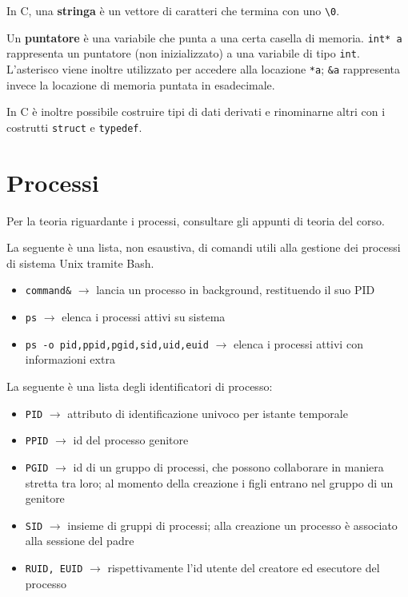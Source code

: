 \documentclass[11pt]{article}
\begin{document}
In C, una \textbf{stringa} è un vettore di caratteri che termina con uno \verb|\0|.

Un \textbf{puntatore} è una variabile che punta a una certa casella di memoria. \verb|int* a| rappresenta un puntatore (non inizializzato) a una variabile di tipo \verb|int|. L'asterisco viene inoltre utilizzato per accedere alla locazione \verb|*a|; \verb|&a| rappresenta invece la locazione di memoria puntata in esadecimale.

In C è inoltre possibile costruire tipi di dati derivati e rinominarne altri con i costrutti \verb|struct| e \verb|typedef|.

\section{Processi}

Per la teoria riguardante i processi, consultare gli appunti di teoria del corso.

La seguente è una lista, non esaustiva, di comandi utili alla gestione dei processi di sistema Unix tramite Bash.

\begin{itemize}
    \item \verb|command&| $\rightarrow$ lancia un processo in background, restituendo il suo PID
    \item \verb|ps| $\rightarrow$ elenca i processi attivi su sistema
    \item \verb|ps -o pid,ppid,pgid,sid,uid,euid| $\rightarrow$ elenca i processi attivi con informazioni extra
\end{itemize}

La seguente è una lista degli identificatori di processo:

\begin{itemize}
    \item \verb|PID| $\rightarrow$ attributo di identificazione univoco per istante temporale
    \item \verb|PPID| $\rightarrow$ id del processo genitore
    \item \verb|PGID| $\rightarrow$ id di un gruppo di processi, che possono collaborare in maniera stretta tra loro; al momento della creazione i figli entrano nel gruppo di un genitore
    \item \verb|SID| $\rightarrow$ insieme di gruppi di processi; alla creazione un processo è associato alla sessione del padre
    \item \verb|RUID, EUID| $\rightarrow$ rispettivamente l'id utente del creatore ed esecutore del processo
\end{itemize}
\end{document}
